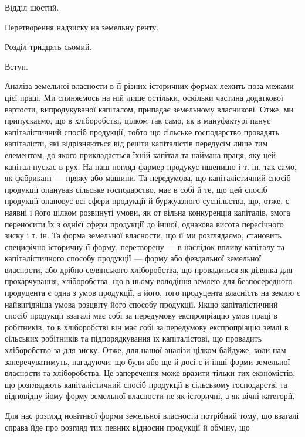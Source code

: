 \parcont{}  %
Відділ шостий.

Перетворення надзиску на
земельну ренту.

Розділ тридцять сьомий.

Вступ.

Аналіза земельної власности в її різних історичних формах лежить поза
межами цієї праці. Ми спиняємось на ній лише остільки, оскільки частина додаткової
вартости, випродукуваної капіталом, припадає земельному власникові.
Отже, ми припускаємо, що в хліборобстві, цілком так само, як в мануфактурі
панує капіталістичний спосіб продукції, тобто що сільське господарство провадять
капіталісти, які відрізняються від решти капіталістів передусім лише тим
елементом, до якого прикладається їхній капітал та наймана праця, яку цей
капітал пускає в рух. На наш погляд фармер продукує пшеницю і т. ін. так
само, як фабрикант — пряжу або машини. Та передумова, що капіталістичний спосіб
продукції опанував сільське господарство, має в собі й те, що цей спосіб продукції
опановує всі сфери продукції й буржуазного суспільства, що, отже,
є наявні і його цілком розвинуті умови, як от вільна конкуренція капіталів,
змога переносити їх з однієї сфери продукції до іншої, однакова висота пересічного
зиску і т. ін. Та форма земельної власности, що її ми розглядаємо,
становить специфічно історичну її форму, перетворену — в наслідок впливу
капіталу та капіталістичного способу продукції — форму або февдальної земельної
власности, або дрібно-селянського хліборобства, що провадиться як ділянка
для прохарчування, хліборобства, що в ньому володіння землею для безпосередного
продуцента є одна з умов продукції, а його, того продуцента власність
на землю є найвигідніша умова розцвіту його способу продукції. Якщо
капіталістичний спосіб продукції взагалі має собі за передумову експропріацію
умов праці в робітників, то в хліборобстві він має собі за передумову
експропріацію землі в сільських робітників та підпорядкування їх капіталістові,
що провадить хліборобство за-для зиску. Отже, для нашої аналізи цілком байдуже,
коли нам заперечуватимуть, нагадуючи, що були або ще й досі є й інші
форми земельної власности та хліборобства. Це заперечення може вразити тільки
тих економістів, що розглядають капіталістичний спосіб продукції в сільському
господарстві та відповідну йому форму земельної власности не як історичні, а як
вічні категорії.

Для нас розгляд новітньої форми земельної власности потрібний тому, що
взагалі справа йде про розгляд тих певних відносин продукції й обміну, що
\parbreak{}  %
